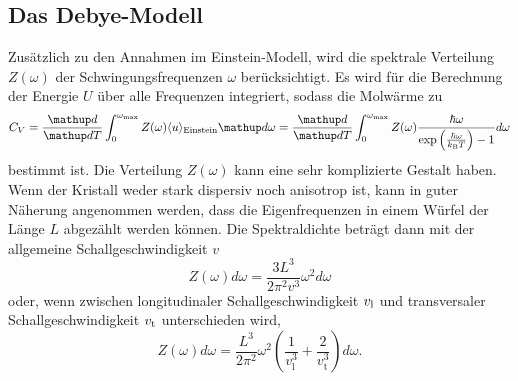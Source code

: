 \subsection{Das Debye-Modell}
\label{sec:theorie_debye}
Zusätzlich zu den Annahmen im Einstein-Modell, wird die spektrale Verteilung $Z(\omega)$ der Schwingungsfrequenzen $\omega$ berücksichtigt.
Es wird für die Berechnung der Energie $U$ über alle Frequenzen integriert, sodass die Molwärme zu
\begin{equation}
	C_V = \frac{\mathup d}{\mathup d T}\int_0^{\omega_\text{max}} Z(\omega) \langle u \rangle _\text{Einstein} \mathup d \omega= \frac{\mathup d}{\mathup d T}\int_0^{\omega_\text{max}} Z(\omega) \frac{\hbar\omega}{\exp{\left(\frac{\hbar\omega}{k_\text B T}\right)} - 1} d\omega
	\label{eqn:cvn}
\end{equation}
bestimmt ist.
Die Verteilung $Z(\omega)$ kann eine sehr komplizierte Gestalt haben. 
Wenn der Kristall weder stark dispersiv noch anisotrop ist, 
kann in guter Näherung angenommen werden, 
dass die Eigenfrequenzen in einem Würfel der Länge $L$ abgezählt werden können.
Die Spektraldichte beträgt dann mit der allgemeine Schallgeschwindigkeit $v$ 
\begin{equation*}
	Z(\omega)d\omega = \frac{3L^3}{2\pi^2v^3}\omega^2 d\omega
\end{equation*}
oder, wenn zwischen longitudinaler Schallgeschwindigkeit $v_\text l$ und transversaler Schallgeschwindigkeit $v_\text t$ unterschieden wird,
\begin{equation}
	Z(\omega)d\omega = \frac{L^3}{2\pi^2}\omega^2\left(\frac{1}{v_\text{l}^3}+\frac{2}{v_{\text{t}}^3}\right)d\omega.
	\label{eqn:z}
\end{equation}

